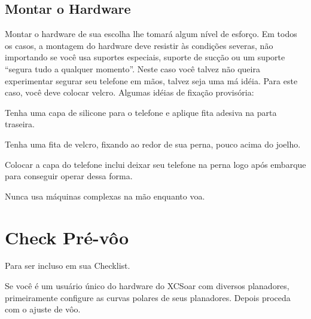 \documentclass[a4paper,12pt]{refrep}
\begin{document}
\subsection{\textcolor{flashblue}{Montar o Hardware}}
Montar o hardware de sua escolha lhe tomará algum nível de esforço.  Em todos os casos, a montagem do hardware deve resistir às condições severas, não importando se você usa suportes especiais, suporte de sucção ou um suporte “segura tudo a qualquer momento”.  Neste caso você talvez não queira experimentar segurar seu telefone em mãos, talvez seja uma má idéia.  Para este caso, você deve colocar velcro.  Algumas idéias de fixação provisória:
\begin{compactitem}
\item Tenha uma capa de silicone para o telefone e aplique fita adesiva na parta traseira.
\item Tenha uma fita de velcro, fixando ao redor de sua perna, pouco acima do joelho.
\item Colocar a capa do telefone inclui deixar seu telefone na perna logo após embarque para conseguir operar dessa forma.
\end{compactitem}
Nunca usa máquinas complexas na mão enquanto voa. 

\newpage
\section{Check Pré-vôo}


Para ser incluso em sua Checklist.

Se você é um usuário único do hardware do XCSoar com diversos planadores, primeiramente configure as curvas polares de seus planadores.  Depois proceda com o ajuste de vôo.
\end{document}
